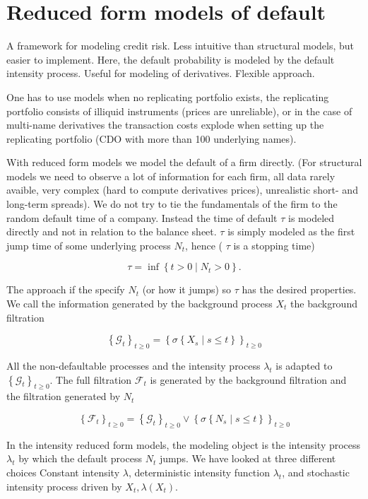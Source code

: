 \chapter{Reduced form models of default}
A framework for modeling credit risk. Less intuitive than structural models, but easier to implement. Here, the default probability is modeled by the default intensity process. Useful for modeling of derivatives. Flexible approach.

One has to use models when no replicating portfolio exists, the replicating portfolio consists of illiquid instruments (prices are unreliable), or in the case of multi-name derivatives the transaction costs explode when setting up the replicating portfolio (CDO with more than 100 underlying names).

With reduced form models we model the default of a firm directly. (For structural models we need to observe a lot of information for each firm, all data rarely avaible, very complex (hard to compute derivatives prices), unrealistic short- and long-term spreads). We do not try to tie the fundamentals of the firm to the random default time of a company. Instead the time of default $\tau$ is modeled directly and not in relation to the balance sheet. $\tau$ is simply modeled as the first jump time of some underlying process $N_{t}$, hence ( $\tau$ is a stopping time)

$$
\tau=\inf \left\{t>0 \mid N_{t}>0\right\} .
$$

The approach if the specify $N_{t}$ (or how it jumps) so $\tau$ has the desired properties.\\
We call the information generated by the background process $X_{t}$ the background filtration

$$
\left\{\mathcal{G}_{t}\right\}_{t \geq 0}=\left\{\sigma\left\{X_{s} \mid s \leq t\right\}\right\}_{t \geq 0}
$$

All the non-defaultable processes and the intensity process $\lambda_{t}$ is adapted to $\left\{\mathcal{G}_{t}\right\}_{t \geq 0}$. The full filtration $\mathcal{F}_{t}$ is generated by the background filtration and the filtration generated by $N_{t}$

$$
\left\{\mathcal{F}_{t}\right\}_{t \geq 0}=\left\{\mathcal{G}_{t}\right\}_{t \geq 0} \vee\left\{\sigma\left\{N_{s} \mid s \leq t\right\}\right\}_{t \geq 0}
$$

In the intensity reduced form models, the modeling object is the intensity process $\lambda_{t}$ by which the default process $N_{t}$ jumps. We have looked at three different choices Constant intensity $\lambda$, deterministic intensity function $\lambda_{t}$, and stochastic intensity process driven by $X_{t}, \lambda\left(X_{t}\right)$.


